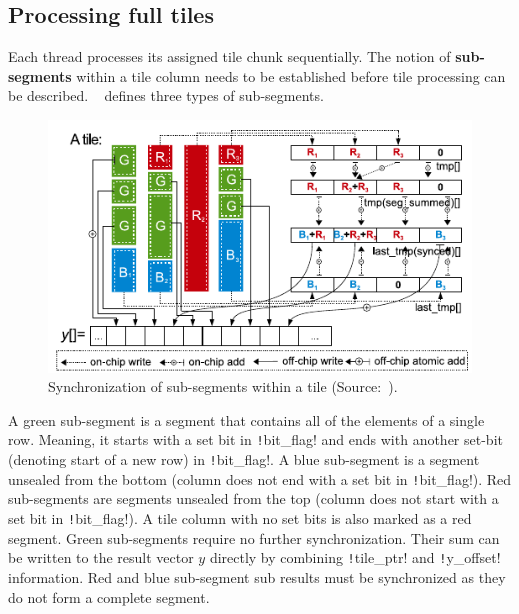 \documentclass[thesis=M,english]{FITthesis}[2019/12/23]
\newcommand{\csre}[1]{\texttt!#1!}
\begin{document}
\subsection{Processing full tiles}

Each thread processes its assigned tile chunk sequentially.
The notion of \textbf{sub-segments} within a tile column needs
to be established before tile processing can be described.
~\cite{liu2015csr5} defines three types of sub-segments.


\begin{figure}[htp]
    \centering
    \includegraphics[scale=1]{static/A_secs.pdf}
    \caption{Synchronization of sub-segments within a tile (Source:~\cite{liu2015csr5}).}\label{csr5:tileSync}
\end{figure}

A green sub-segment is a segment that contains
all of the elements of a single row. Meaning, it starts with a set bit in \csre{bit_flag} and ends with
another set-bit (denoting start of a new row) in \csre{bit_flag}. A blue sub-segment is a segment unsealed from
the bottom (column does not end with a set bit in \csre{bit_flag}).
Red sub-segments are segments unsealed from the top (column does not start with a set bit in \csre{bit_flag}).
A tile column with no set bits is also marked as a red segment.
Green sub-segments require no further synchronization. Their sum can be written to the result vector \(y\)
directly by combining \csre{tile_ptr} and \csre{y_offset} information. Red and blue sub-segment sub results must
be synchronized as they do not form a complete segment.
\end{document}
